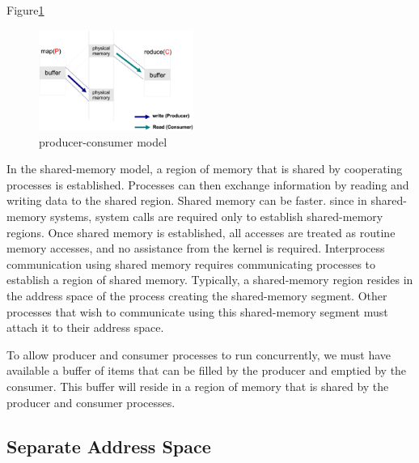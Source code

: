 Figure\ref{fig:dmr:spmc}
\begin{figure}[!h!t]
    \centering
    \includegraphics[width=0.45\textwidth]{eps/dmr_pc_model.eps}
    \caption{producer-consumer model}
    \label{fig:dmr:spmc}
\end{figure}
{\color{gray}
In the shared-memory model, a region of memory that is shared
by cooperating processes is established. 
Processes can then exchange information 
by reading and writing data to the shared region.
Shared memory can be faster.
since in shared-memory systems, system calls are required only to establish shared-memory regions. 
Once shared memory is established, all accesses are treated
as routine memory accesses, and no assistance from the kernel is required.
}
Interprocess communication using shared memory requires communicating
processes to establish a region of shared memory. Typically, a shared-memory
region resides in the address space of the process creating the shared-memory
segment. Other processes that wish to communicate using this shared-memory
segment must attach it to their address space. 

To allow producer and consumer processes to run concurrently, we must have
available a buffer of items that can be filled by the producer and emptied by
the consumer. This buffer will reside in a region of memory that is shared by
the producer and consumer processes.



\subsection{Separate Address Space}
